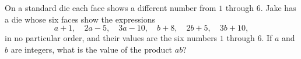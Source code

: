 On a standard die each face shows a different number from $1$ through $6$. Jake has a die whose six faces show the expressions
\[
a+1,\quad 2a-5,\quad 3a-10,\quad b+8,\quad 2b+5,\quad 3b+10,
\]
in no particular order, and their values are the six numbers $1$ through $6$. If $a$ and $b$ are integers, what is the value of the product $ab$?
